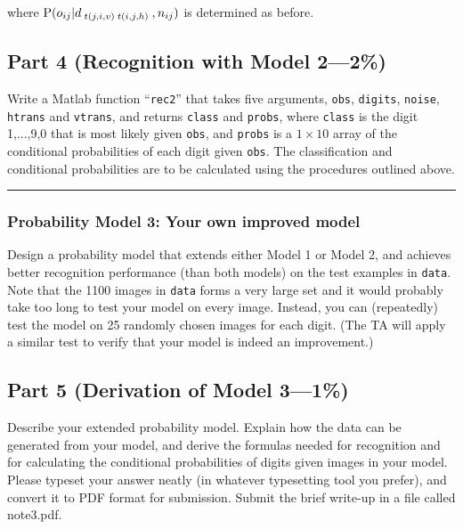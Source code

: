 \documentclass[12pt]{article}
\begin{document}
where %
${\rm P}(o_{ij}|d_{\;t(j,i,v)\;t(i,j,h)\;},n_{ij})$ is determined as before.


\subsection*{Part 4 \rm(Recognition with Model 2---2\%)}


Write a Matlab function ``{\tt rec2}'' that takes five arguments,
{\tt obs}, {\tt digits}, {\tt noise}, {\tt htrans} and {\tt vtrans},
and returns {\tt class} and {\tt probs},
where {\tt class} is the digit 1,...,9,0 that is most likely given
{\tt obs}, and {\tt probs} is a $1\times10$ array of the conditional
probabilities of each digit given {\tt obs}.
The classification and conditional probabilities are to be calculated
using the procedures outlined above.


\vspace*{1\baselineskip}


\newpage
\hrule

\subsubsection*{Probability Model 3: Your own improved model}


Design a probability model that extends either Model 1 or Model 2,
and achieves better recognition performance (than both models) on the
test examples in {\tt data}.
Note that the 1100 images in {\tt data} forms a very large set
and it would probably take too long to test your model on every image.
Instead, you can (repeatedly) test the model on 25 randomly chosen
images for each digit.
(The TA will apply a similar test to verify that your model is indeed
an improvement.)


\subsection*{Part 5 \rm(Derivation of Model 3---1\%)}

Describe your extended probability model.
Explain how the data can be generated from your model,
and derive the formulas needed for recognition
and for calculating the conditional probabilities of digits given images
in your model.
Please typeset your answer neatly (in whatever typesetting tool you prefer),
and convert it to PDF format for submission.
Submit the brief write-up in a file called note3.pdf.
\end{document}
